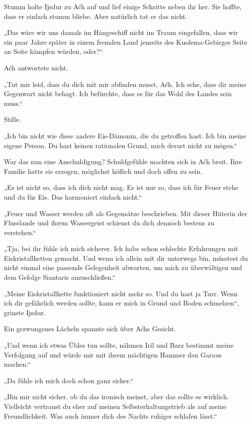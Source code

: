 Stumm holte Ijsdur zu Aćh auf und lief einige Schritte neben ihr her. Sie hoffte, dass er einfach stumm bliebe. Aber natürlich tat er das nicht.

„Das wäre wir uns damals im Hängeschiff nicht im Traum eingefallen, dass wir ein paar Jahre später in einem fremden Land jenseits des Kuolema-Gebirges Seite an Seite kämpfen würden, oder?“

Aćh antwortete nicht.

„Tut mir leid, dass du dich mit mir abfinden musst, Aćh. Ich sehe, dass dir meine Gegenwart nicht behagt. Ich befürchte, dass es für das Wohl des Landes sein muss.“

Stille.

„Ich bin nicht wie diese andere Eis-Dämonin, die du getroffen hast. Ich bin meine eigene Person. Du hast keinen rationalen Grund, mich derart nicht zu mögen.“

War das nun eine Anschuldigung? Schuldgefühle machten sich in Aćh breit. Ihre Familie hatte sie erzogen, möglichst höflich und doch offen zu sein.

„Es ist nicht so, dass ich dich nicht mag. Es ist nur so, dass ich für Feuer stehe und du für Eis. Das harmoniert einfach nicht.“

„Feuer und Wasser werden oft als Gegensätze beschrieben. Mit dieser Hüterin der Flusslande und ihrem Wassergeist schienst du dich dennoch bestens zu verstehen.“

„Tja, bei ihr fühle ich mich sicherer. Ich habe schon schlechte Erfahrungen mit Eiskristallketten gemacht. Und wenn ich allein mit dir unterwegs bin, müsstest du nicht einmal eine passende Gelegenheit abwarten, um mich zu überwältigen und dem Gefolge Siantaris anzuschließen.“

„Meine Eiskristallkette funktioniert nicht mehr so. Und du hast ja Turr. Wenn ich dir gefährlich werden sollte, kann er mich in Grund und Boden schmelzen“, grinste Ijsdur.

Ein gezwungenes Lächeln spannte sich über Aćhs Gesicht.

„Und wenn ich etwas Übles tun sollte, nähmen Iril und Barz bestimmt meine Verfolgung auf und würde mir mit ihrem mächtigen Hammer den Garaus machen.“

„Da fühle ich mich doch schon ganz sicher.“

„Bin mir nicht sicher, ob du das ironisch meinst, aber das sollte es wirklich. Vielleicht vertraust du eher auf meinen Selbsterhaltungstrieb als auf meine Freundlichkeit. Was auch immer dich des Nachts ruhiger schlafen lässt.“

